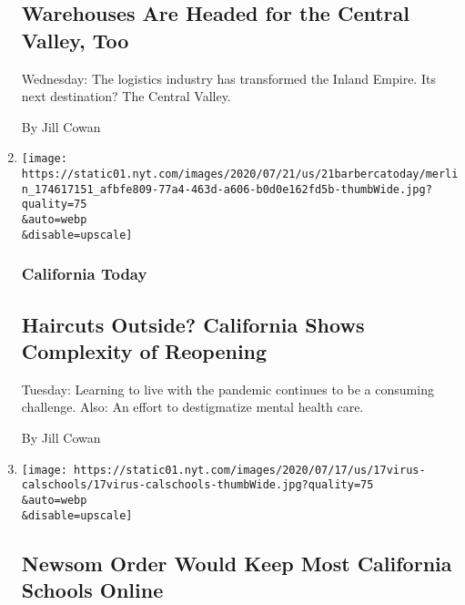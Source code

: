 \begin{enumerate}
  \hypertarget{warehouses-are-headed-for-the-central-valley-too}{%
  \subsection{Warehouses Are Headed for the Central Valley,
  Too}\label{warehouses-are-headed-for-the-central-valley-too}}

  Wednesday: The logistics industry has transformed the Inland Empire.
  Its next destination? The Central Valley.

  By Jill Cowan
\item
  \href{/2020/07/21/us/california-coronavirus-cases.html}{}

  \texttt{[image: https://static01.nyt.com/images/2020/07/21/us/21barbercatoday/merlin\_174617151\_afbfe809-77a4-463d-a606-b0d0e162fd5b-thumbWide.jpg?quality=75\\\&auto=webp\\\&disable=upscale]}

  \hypertarget{california-today-6}{%
  \subsubsection{California Today}\label{california-today-6}}

  \hypertarget{haircuts-outside-california-shows-complexity-of-reopening}{%
  \subsection{Haircuts Outside? California Shows Complexity of
  Reopening}\label{haircuts-outside-california-shows-complexity-of-reopening}}

  Tuesday: Learning to live with the pandemic continues to be a
  consuming challenge. Also: An effort to destigmatize mental health
  care.

  By Jill Cowan
\item
  \href{/2020/07/17/us/california-schools-reopening-newsom.html}{}

  \texttt{[image: https://static01.nyt.com/images/2020/07/17/us/17virus-calschools/17virus-calschools-thumbWide.jpg?quality=75\\\&auto=webp\\\&disable=upscale]}

  \hypertarget{newsom-order-would-keep-most-california-schools-online}{%
  \subsection{Newsom Order Would Keep Most California Schools
  Online}\label{newsom-order-would-keep-most-california-schools-online}}


\end{enumerate}
